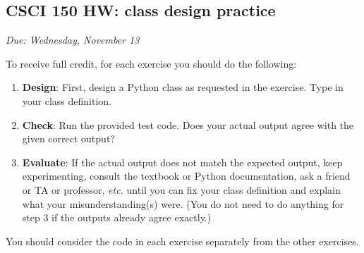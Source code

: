 \documentclass[]{article}
\date{}
\begin{document}
\hypertarget{csci-150-hw-class-design-practice}{%
\subsection{CSCI 150 HW: class design
practice}\label{csci-150-hw-class-design-practice}}

\emph{Due: Wednesday, November 13}

To receive full credit, for each exercise you should do the following:

\begin{enumerate}
\def\labelenumi{\arabic{enumi}.}
\item
  \textbf{Design}: First, design a Python class as requested in the
  exercise. Type in your class definition.
\item
  \textbf{Check}: Run the provided test code. Does your actual output
  agree with the given correct output?
\item
  \textbf{Evaluate}: If the actual output does not match the expected
  output, keep experimenting, consult the textbook or Python
  documentation, ask a friend or TA or professor, \emph{etc.} until you
  can fix your class definition and explain what your
  misunderstanding(s) were. (You do not need to do anything for step 3
  if the outputs already agree exactly.)
\end{enumerate}

You should consider the code in each exercise separately from the other
exercises.
\end{document}
